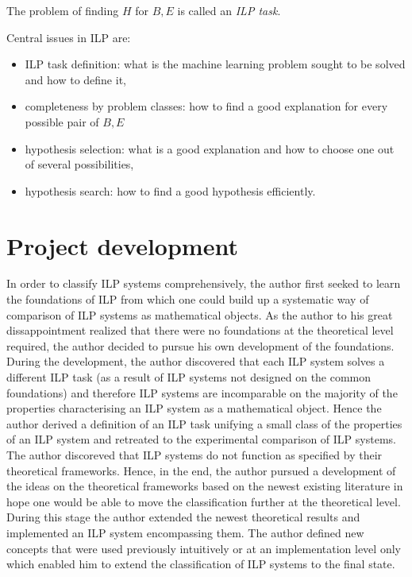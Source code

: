 The problem of finding $H$ for $B, E$ is called an \emph{ILP task}.

Central issues in ILP are:
\begin{itemize}
\item ILP task definition: what is the machine learning problem sought to be solved and how to define it,
\item completeness by problem classes: how to find a good explanation for every possible pair of $B, E$
\item hypothesis selection: what is a good explanation and how to choose one out of several possibilities,
\item hypothesis search: how to find a good hypothesis efficiently.
\end{itemize}

\section{Project development}
In order to classify ILP systems comprehensively, the author first seeked to learn the foundations of ILP from which one could build up a systematic way of comparison of ILP systems as mathematical objects. As the author to his great dissappointment realized that there were no foundations at the theoretical level required, the author decided to pursue his own development of the foundations. During the development, the author discovered that each ILP system solves a different ILP task (as a result of ILP systems not designed on the common foundations) and therefore ILP systems are incomparable on the majority of the properties characterising an ILP system as a mathematical object. Hence the author derived a definition of an ILP task unifying a small class of the properties of an ILP system and retreated to the experimental comparison of ILP systems. The author discoreved that ILP systems do not function as specified by their theoretical frameworks. Hence, in the end, the author pursued a development of the ideas on the theoretical frameworks based on the newest existing literature in hope one would be able to move the classification further at the theoretical level. During this stage the author extended the newest theoretical results and implemented an ILP system encompassing them. The author defined new concepts that were used previously intuitively or at an implementation level only which enabled him to extend the classification of ILP systems to the final state.
